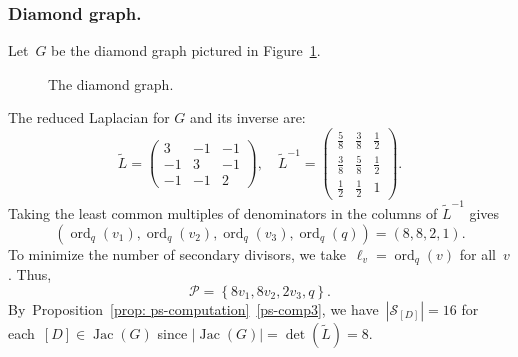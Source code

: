 \documentclass{amsart}
\DeclareMathOperator{\Jac}{Jac}
\DeclareMathOperator{\ord}{ord}
\newcommand{\primary}{\mathcal{P}}
\newcommand{\secondary}{\mathcal{S}}
\newcommand{\tL}{\tilde{L}}
\newcommand{\tl}{\ell}
\begin{document}
\subsubsection{Diamond graph.}\label{example: ps-diamond}  Let~$G$ be the diamond graph pictured in
Figure~\ref{fig: diamond graph}.
\begin{figure}[ht]
\centering
{}
\caption{The diamond graph.}\label{fig: diamond graph}
\end{figure}
The reduced Laplacian for $G$ and its inverse are:
\[
\tL=
\left(\begin{array}{rrr}
3 & -1 & -1 \\
-1 & 3 & -1 \\
-1 & -1 & 2
\end{array}\right),
\quad
\tL^{-1}=
\left(\begin{array}{rrr}
\frac{5}{8} & \frac{3}{8} & \frac{1}{2} \\[5pt]
\frac{3}{8} & \frac{5}{8} & \frac{1}{2} \\[5pt]
\frac{1}{2} & \frac{1}{2} & 1
\end{array}\right).
\]
Taking the least common multiples of denominators in the columns of $\tL^{-1}$ gives 
\[
  (\ord_{q}(v_1),\ord_{q}(v_2),\ord_{q}(v_3),\ord_{q}(q)) =(8,8,2,1).
\]
To minimize the number of secondary divisors, we take~$\tl_v=\ord_{q}(v)$
for all~$v$.  Thus,
\[
  \primary=\left\{8v_1,8v_2,2v_3,q \right\}.
\]
By~Proposition~\ref{prop: ps-computation}~\ref{ps-comp3}, we
have~$|\secondary_{[D]}|=16$ for each~$[D]\in\Jac(G)$ since
$|\Jac(G)|=\det(\tL)=8$.
\end{document}
